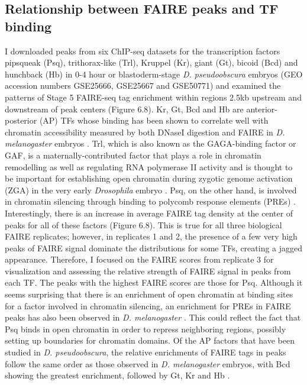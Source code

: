 \subsection{Relationship between FAIRE peaks and TF binding}
I downloaded peaks from six ChIP-seq datasets for the transcription factors pipsqueak (Psq), trithorax-like (Trl), Kruppel (Kr), giant (Gt), bicoid (Bcd) and hunchback (Hb) in 0-4 hour or blastoderm-stage \emph{D. pseudoobscura} embryos (GEO accession numbers GSE25666, GSE25667 and GSE50771) and examined the patterns of Stage 5 FAIRE-seq tag enrichment within regions 2.5kb upstream and downstream of peak centers (Figure 6.8). Kr, Gt, Bcd and Hb are anterior-posterior (AP) TFs whose binding has been shown to correlate well with chromatin accessibility measured by both DNaseI digestion and FAIRE in \emph{D. melanogaster} embryos \citep{mckay_common_2013,li_role_2011}. Trl, which is also known as the GAGA-binding factor or GAF, is a maternally-contributed factor that plays a role in chromatin remodelling as well as regulating RNA polymerase II activity and is thought to be important for establishing open chromatin during zygotic genome activation (ZGA) in the very early \emph{Drosophila} embryo \citep{darbo_transcriptional_2013}. Psq, on the other hand, is involved in chromatin silencing through binding to polycomb response elements (PREs) \citep{huang_pipsqueak_2002}. Interestingly, there is an increase in average FAIRE tag density at the center of peaks for all of these factors (Figure 6.8). This is true for all three biological FAIRE replicates; however, in replicates 1 and 2, the presence of a few very high peaks of FAIRE signal dominate the distributions for some TFs, creating a jagged appearance. Therefore, I focused on the FAIRE scores from replicate 3 for visualization and assessing the relative strength of FAIRE signal in peaks from each TF. The peaks with the highest FAIRE scores are those for Psq. Although it seems surprising that there is an enrichment of open chromatin at binding sites for a factor involved in chromatin silencing, an enrichment for PREs in FAIRE peaks has also been observed in \emph{D. melanogaster} \citep{mckay_common_2013}. This could reflect the fact that Psq binds in open chromatin in order to repress neighboring regions, possibly setting up boundaries for chromatin domains. Of the AP factors that have been studied in \emph{D. pseudoobscura}, the relative enrichments of FAIRE tags in peaks follow the same order as those observed in \emph{D. melanogaster} embryos, with Bcd showing the greatest enrichment, followed by Gt, Kr and Hb \citep{mckay_common_2013}.

